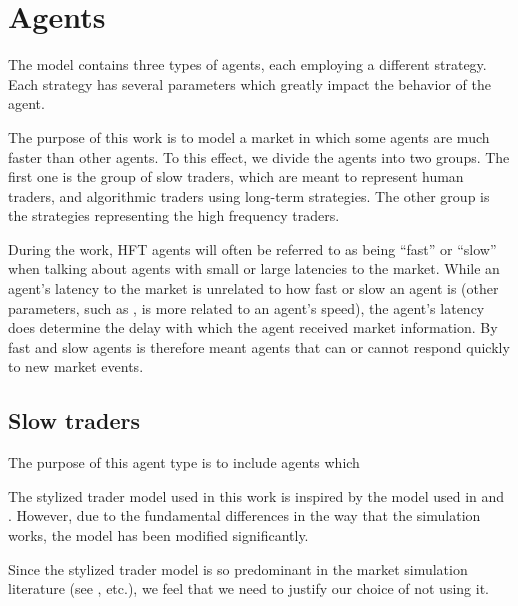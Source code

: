 \section{Agents}\label{section:agents}
The model contains three types of agents, each employing a different strategy. Each strategy has several parameters which greatly impact the behavior of the agent.

The purpose of this work is to model a market in which some agents are much faster than other agents. To this effect, we divide the agents into two groups. The first one is the group of slow traders, which are meant to represent human traders, and algorithmic traders using long-term strategies. The other group is the strategies representing the high frequency traders. 

\cite{Reference1}

During the work, HFT agents will often be referred to as being ``fast'' or ``slow'' when talking about agents with small or large latencies to the market. While an agent's latency to the market is unrelated to how fast or slow an agent is (other parameters, such as ,  is more related to an agent's speed), the agent's latency does determine the delay with which the agent received market information. By fast and slow agents is therefore meant agents that can or cannot respond quickly to new market events.


\subsection{Slow traders}\label{section:slow_traders}


The purpose of this agent type is to include agents which 

The stylized trader model used in this work is inspired by the model used in \cite{chiWang} and \cite{theImpactOfHeterogenous}. However, due to the fundamental differences in the way that the simulation works, the model has been modified significantly. 

Since the stylized trader model is so predominant in the market simulation literature (see \cite{asd}, \cite{asd} etc.), we feel that we need to justify our choice of not using it. 

